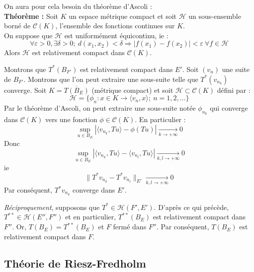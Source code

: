 


\begin{dem}
On aura pour cela besoin du théorème d'Ascoli :\\
\textbf{Théorème :} Soit $K$ un espace métrique compact et soit $\mathcal{H}$ un sous-ensemble borné de $\mathcal{C}(K)$, l'ensemble des fonctions continues sur $K$.\\
On suppose que $\mathcal{H}$ est uniformément équicontinu, ie : \[\forall \varepsilon>0, \exists\delta>0;\ d(x_1,x_2)<\delta\Rightarrow |f(x_1)-f(x_2)|<\varepsilon\ \forall f\in\mathcal{H}\]
Alors $\mathcal{H}$ est relativement compact dans $\mathcal{C}(K)$.

\bigskip
Montrons que $T^*(B_{F'})$ est relativement compact dans $E'$. Soit $(v_n)$ une suite de $B_{F'}$. Montrons que l'on peut extraire une sous-suite telle que $T^*(v_{n_k})$ converge. Soit $K=\overline{T(B_E)}$ (métrique compact) et soit $\mathcal{H}\subset\mathcal{C}(K)$ défini par : 
\[\mathcal{H}=\{\phi_n:x\in K\to\langle v_n, x\rangle;\ n=1,2,...\}\]
Par le théorème d'Ascoli, on peut extraire une sous-suite notée $\phi_{n_k}$ qui converge dans $\mathcal{C}(K)$ vers une fonction $\phi\in\mathcal{C}(K)$. En particulier : 
	\[\sup_{u\in B_E}|\langle v_{n_k},Tu\rangle - \phi(Tu)|\xrightarrow[k\to+\infty]{} 0\]
Donc
	\[\sup_{u\in B_E}|\langle v_{n_k},Tu\rangle - \langle v_{n_l},Tu\rangle|\xrightarrow[k,l\to+\infty]{} 0\]
ie
	\[\|T^* v_{n_k}-T^* v_{n_l}\|_{E'}\xrightarrow[k,l\to +\infty]{} 0\]
Par conséquent, $T^*v_{n_k}$ converge dans $E'$.

\bigskip
\textit{Réciproquement}, supposons que $T^*\in\mathscr{H}(F',E')$. D'après ce qui précède, $T^{**}\in\mathscr{H}(E'',F'')$ et en particulier, $T^{**}(B_E)$ est relativement compact dans $F''$. Or, $T(B_E)=T^{**}(B_E)$ et $F$ fermé dans $F''$. Par conséquent, $T(B_E)$ est relativement compact dans $F$.
\end{dem}

\subsection{Théorie de Riesz-Fredholm}

